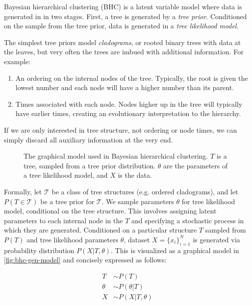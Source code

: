 \documentclass{article}
\begin{document}
Bayesian hierarchical clustering (BHC)
is a latent variable model where
data is generated in
in two stages.
First, a tree is generated by a
\emph{tree prior}.
Conditioned on the sample
from the tree prior,
data is generated in
a \emph{tree likelihood model}.

The simplest tree priors
model \emph{cladograms},
or rooted binary trees
with data at the leaves,
but very often the trees are imbued with
additional information.
For example:

\begin{enumerate}
  \item An ordering on the internal nodes of the tree.
    Typically, the root is given the lowest number and
    each node will have a higher number than its parent.
  \item Times associated with each node.
    Nodes higher up in the tree will typically have
    earlier times, creating an evolutionary
    interpretation to the hierarchy.
\end{enumerate}

If we are only interested in tree structure,
not ordering or node times, we can simply discard
all auxiliary information at the very end.

\begin{figure}[H]
  \centering
  
  \caption{The graphical model used
  in Bayesian hierarchical clustering. $T$
  is a tree, sampled from a tree prior distribution.
  $\theta$ are the parameters of a tree likelihood
  model, and $X$ is the data.}
\label{fig:bhc-gen-model}
\end{figure}

Formally,
let $\mathcal{T}$ be a class
of tree structures (e.g. ordered cladograms),
and let $P(T \in \mathcal{T})$
be a tree prior
for $\mathcal{T}$.
We sample parameters $\theta$ for tree likelihood model,
conditional on the tree structure.
This involves assigning
latent parameters to each internal node in the $T$
and specifying a stochastic process in which they are generated.
Conditioned on a particular
structure $T$ sampled from $P(T)$
and tree likelihood parameters $\theta$, dataset
$X = {\{x_i\}}_{i = 1}^N$
is generated
via probability distribution $P(X | T, \theta)$.
This is visualized as a graphical model in \autoref{fig:bhc-gen-model}
and concisely expressed as follows:

\begin{align*}
  T &\sim P(T) \\
  \theta &\sim P(\theta | T) \\
  X &\sim P(X | T, \theta)
\end{align*}
\end{document}
